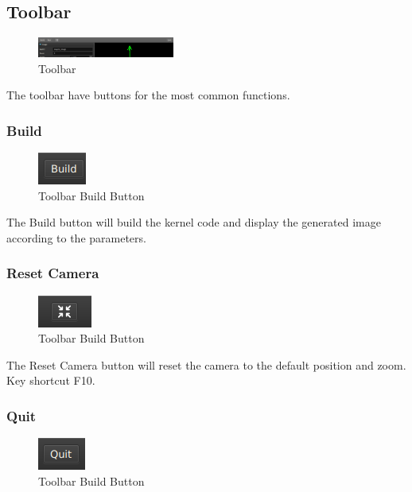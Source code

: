 \subsection{Toolbar}

\begin{figure}[h]
\centering
\includegraphics[width=0.4\textwidth]{imgs/toolbar-screenshot-0.png}
\caption{Toolbar}\label{fig:toolbar-screenshot-0}
\end{figure}

The toolbar have buttons for the most common functions.

\subsubsection{Build}

\begin{figure}[h]
\centering
\includegraphics{imgs/toolbar-build-0.png}
\caption{Toolbar Build Button}\label{fig:toolbar-build-0}
\end{figure}

The Build button will build the kernel code and display the generated image
according to the parameters.

\subsubsection{Reset Camera}

\begin{figure}[h]
\centering
\includegraphics{imgs/toolbar-reset-camera-0.png}
\caption{Toolbar Build Button}\label{fig:toolbar-reset-camera-0}
\end{figure}

The Reset Camera button will reset the camera to the default position and zoom.
Key shortcut F10.

\subsubsection{Quit}

\begin{figure}[h]
\centering
\includegraphics{imgs/toolbar-quit-0.png}
\caption{Toolbar Build Button}\label{fig:toolbar-quit-0}
\end{figure}

